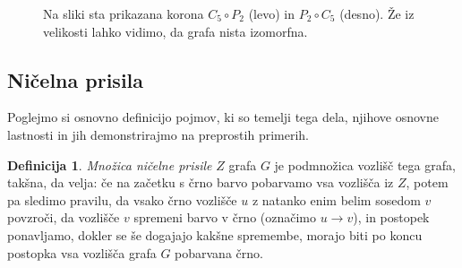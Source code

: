 \documentclass[12pt,a4paper,twoside]{article}
\theoremstyle{definition} %
\newtheorem{definicija}{Definicija}[section]
\theoremstyle{plain} %
\numberwithin{equation}{section}  %
\begin{document}
\begin{figure}[h]
\begin{subfigure}{0.66\textwidth}
    \end{subfigure}
    \caption{Na sliki sta prikazana korona $C_5 \circ P_2$ (levo) in $P_2 \circ C_5$ (desno). Že iz velikosti lahko vidimo, da grafa nista izomorfna.}
    \label{fig:korona-poti-cikla}
\end{figure}

\subsection{Ničelna prisila}

Poglejmo si osnovno definicijo pojmov, ki so temelji tega dela, njihove osnovne lastnosti in jih demonstrirajmo na preprostih primerih.

\begin{definicija}
    \emph{Množica ničelne prisile} $Z$ grafa $G$ je podmnožica vozlišč tega grafa, takšna, da velja: če na začetku s črno barvo pobarvamo vsa vozlišča iz $Z$, potem pa sledimo pravilu, da vsako črno vozlišče $u$ z natanko enim belim sosedom $v$ povzroči, da vozlišče $v$ spremeni barvo v črno (označimo $u \rightarrow v$), in postopek ponavljamo, dokler se še dogajajo kakšne spremembe, morajo biti po koncu postopka vsa vozlišča grafa $G$ pobarvana črno.
\end{definicija}
\end{document}
